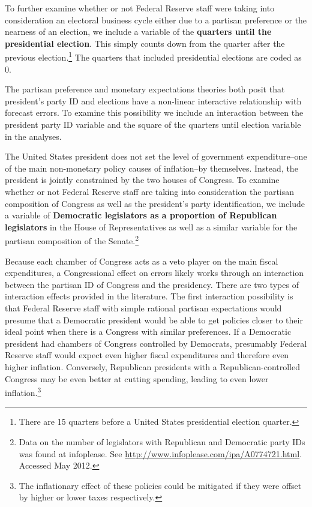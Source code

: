 \documentclass[a4paper]{article}\usepackage{graphicx, color}
\begin{document}
To further examine whether or not Federal Reserve staff were taking into consideration an electoral business cycle either due to a partisan preference or the nearness of an election, we include a variable of the {\bf{quarters until the presidential election}}. This simply counts down from the quarter after the previous election.\footnote{There are 15 quarters before a United States presidential election quarter.} The quarters that included presidential elections are coded as 0. 

The partisan preference and monetary expectations theories both posit that president's party ID and elections have a non-linear interactive relationship with forecast errors. To examine this possibility we include an interaction between the president party ID variable and the square of the quarters until election variable in the analyses.

The United States president does not set the level of government expenditure--one of the main non-monetary policy causes of inflation--by themselves. Instead, the president is jointly constrained by the two houses of Congress. To examine whether or not Federal Reserve staff are taking into consideration the partisan composition of Congress as well as the president's party identification, we include a variable of {\bf{Democratic legislators as a proportion of Republican legislators}} in the House of Representatives as well as a similar variable for the partisan composition of the Senate.\footnote{Data on the number of legislators with Republican and Democratic party IDs was found at infoplease. See {\url{http://www.infoplease.com/ipa/A0774721.html}}. Accessed May 2012.} 

Because each chamber of Congress acts as a veto player on the main fiscal expenditures, a Congressional effect on errors likely works through an interaction between the partisan ID of Congress and the presidency. There are two types of interaction effects provided in the literature. The first interaction possibility is that Federal Reserve staff with simple rational partisan expectations would presume that a Democratic president would be able to get policies closer to their ideal point when there is a Congress with similar preferences. If a Democratic president had chambers of Congress controlled by Democrats, presumably Federal Reserve staff would expect even higher fiscal expenditures and therefore even higher inflation. Conversely, Republican presidents with a Republican-controlled Congress may be even better at cutting spending, leading to even lower inflation.\footnote{The inflationary effect of these policies could be mitigated if they were offset by higher or lower taxes respectively.}
\end{document}
